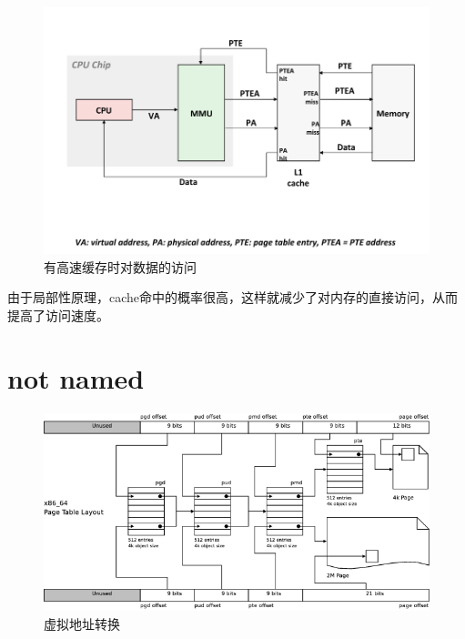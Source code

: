 \begin{figure}[!htbp]
\begin{center}
\includegraphics[width=1\textwidth]{highvava.png}
\caption{有高速缓存时对数据的访问}
\end{center}
\end{figure}

由于局部性原理，cache命中的概率很高，这样就减少了对内存的直接访问，从而提高了访问速度。



\section{not named}
\begin{figure}[htbp]
\begin{center}
\includegraphics[width=1\textwidth]{va-to-pa.png}
\caption{虚拟地址转换\cite{linuxmm}}
\end{center}
\end{figure}


